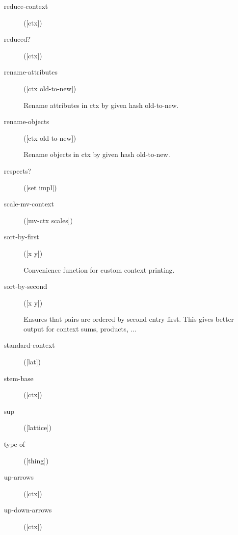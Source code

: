 \begin{description}
  \item[reduce-context]
([ctx])



  \item[reduced?]
([ctx])



  \item[rename-attributes]
([ctx old-to-new])

Rename attributes in ctx by given hash old-to-new.

  \item[rename-objects]
([ctx old-to-new])

Rename objects in ctx by given hash old-to-new.

  \item[respects?]
([set impl])



  \item[scale-mv-context]
([mv-ctx scales])



  \item[sort-by-first]
([x y])

Convenience function for custom context printing.

  \item[sort-by-second]
([x y])

Ensures that pairs are ordered by second entry first. This gives
  better output for context sums, products, ...

  \item[standard-context]
([lat])



  \item[stem-base]
([ctx])



  \item[sup]
([lattice])



  \item[type-of]
([thing])



  \item[up-arrows]
([ctx])



  \item[up-down-arrows]
([ctx])



\end{description}

